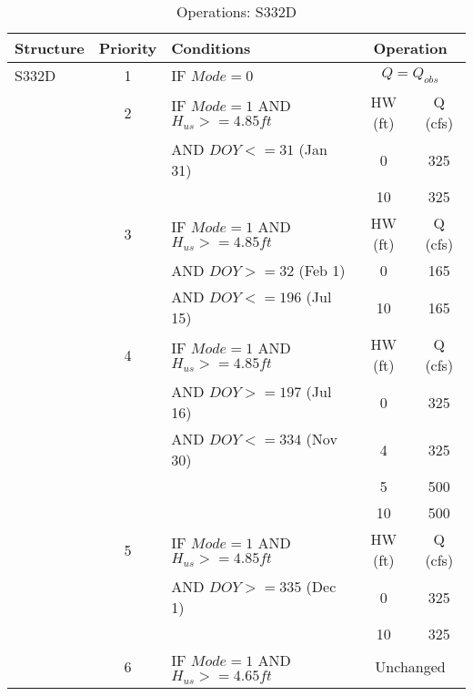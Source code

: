 \clearpage



\scriptsize
\begin{table}[!h]
\centering
\caption{Operations: S332D}
\label{tab:M11opsS332D}
\begin{tabular}{|l|c|l|c|c|}
\hline
\textbf{Structure} & \textbf{Priority}  & \textbf{Conditions} & \multicolumn{2}{|c|}{\textbf{Operation}}   \\
\hline
\hline
S332D         &  1  & IF $Mode=0$                                  & \multicolumn{2}{|c|}{$Q = Q_{obs}$}   \\
\hline
              &  2  & IF $Mode=1$ AND $H_{us}>=4.85ft$             & HW (ft) & Q (cfs)  \\
              &     & AND $DOY<=31$ (Jan 31)                       & 0    &  325 \\
              &     &                                              & 10   &  325 \\
\hline
              &  3  & IF $Mode=1$ AND $H_{us}>=4.85ft$             & HW (ft) & Q (cfs)  \\
              &     & AND $DOY>=32$ (Feb 1)                        & 0    &  165 \\
              &     & AND $DOY<=196$ (Jul 15)                      & 10   &  165 \\
\hline
              &  4  & IF $Mode=1$ AND $H_{us}>=4.85ft$             & HW (ft) & Q (cfs)  \\
              &     & AND $DOY>=197$ (Jul 16)                      & 0    &  325 \\
              &     & AND $DOY<=334$ (Nov 30)                      & 4    &  325 \\
              &     &                                              & 5    &  500 \\
              &     &                                              & 10   &  500 \\
\hline
              &  5  & IF $Mode=1$ AND $H_{us}>=4.85ft$             & HW (ft) & Q (cfs)  \\
              &     & AND $DOY>=335$ (Dec 1)                       & 0    &  325 \\
              &     &                                              & 10   &  325 \\
\hline
              &  6  & IF $Mode=1$ AND $H_{us}>=4.65ft$             & \multicolumn{2}{|c|}{Unchanged}   \\
\hline



\end{tabular}
\end{table}
